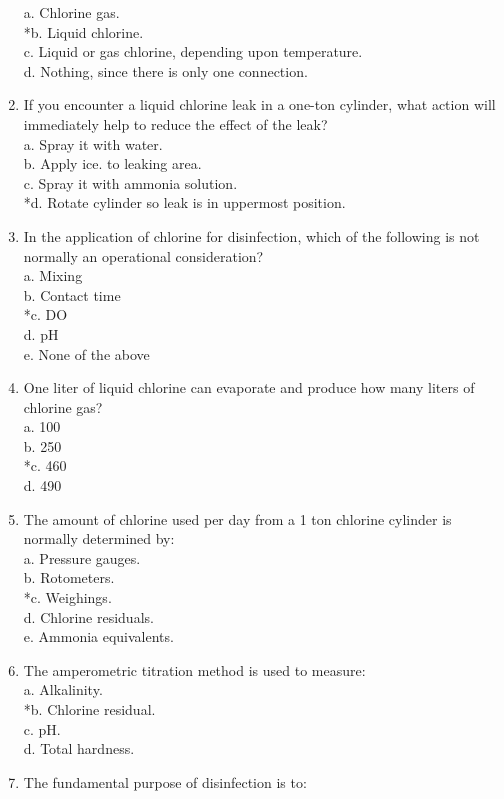 \begin{enumerate}
a. Chlorine gas. \\
*b. Liquid chlorine. \\
c. Liquid or gas chlorine, depending upon temperature. \\
d. Nothing, since there is only one connection. \\
\item If you encounter a liquid chlorine leak in a one-ton cylinder, what action will immediately help to reduce the effect of the leak? \\
a. Spray it with water. \\
b. Apply ice. to leaking area. \\
c. Spray it with ammonia solution. \\
*d. Rotate cylinder so leak is in uppermost position. \\
\item In the application of chlorine for disinfection, which of the following is not normally an operational consideration? \\
a. Mixing \\
b. Contact time \\
*c. DO \\
d. pH \\
e. None of the above \\
\item One liter of liquid chlorine can evaporate and produce how many liters of chlorine gas? \\
a. 100 \\
b. 250 \\
*c. 460 \\
d. 490 \\
\item The amount of chlorine used per day from a 1 ton chlorine cylinder is normally determined by: \\
a. Pressure gauges. \\
b. Rotometers. \\
*c. Weighings. \\
d. Chlorine residuals. \\
e. Ammonia equivalents. \\
\item The amperometric titration method is used to measure: \\
a. Alkalinity. \\
*b. Chlorine residual. \\
c. pH. \\
d. Total hardness. \\
\item The fundamental purpose of disinfection is to: \\

\end{enumerate}
